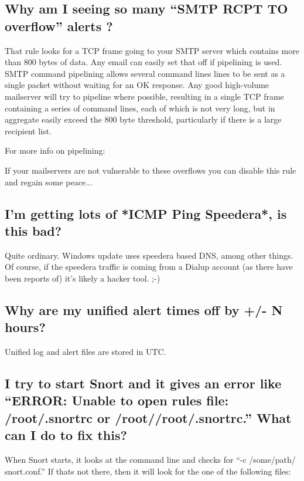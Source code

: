 \documentclass{article}
\begin{document}
\subsection{Why am I seeing so many ``SMTP RCPT TO overflow'' alerts ?}

That rule looks for a TCP frame going to your SMTP server which contains more
than 800 bytes of data. Any email can easily set that off if pipelining is
used. SMTP command pipelining allows several command lines lines to be sent as
a single packet without waiting for an OK response. Any good high-volume
mailserver will try to pipeline where possible, resulting in a single TCP frame
containing a series of command lines, each of which is not very long, but in
aggregate easily exceed the 800 byte threshold, particularly if there is a
large recipient list.

For more info on pipelining:


If your mailservers are not vulnerable to these overflows you can disable this
rule and regain some peace...

\subsection{I'm getting lots of *ICMP Ping Speedera*, is this bad?}

Quite ordinary. Windows update uses speedera based DNS, among other things. Of
course, if the speedera traffic is coming from a Dialup account (as there have
been reports of) it's likely a hacker tool. ;-)

\subsection{Why are my unified alert times off by +/- N hours?}

Unified log and alert files are stored in UTC.

\subsection{I try to start Snort and it gives an error like ``ERROR: Unable to open
rules file: /root/.snortrc or /root//root/.snortrc.'' What can I do to fix this?}

When Snort starts, it looks at the command line and checks for ``-c /some/path/
snort.conf.'' If thats not there, then it will look for the one of the following
files:
\end{document}
